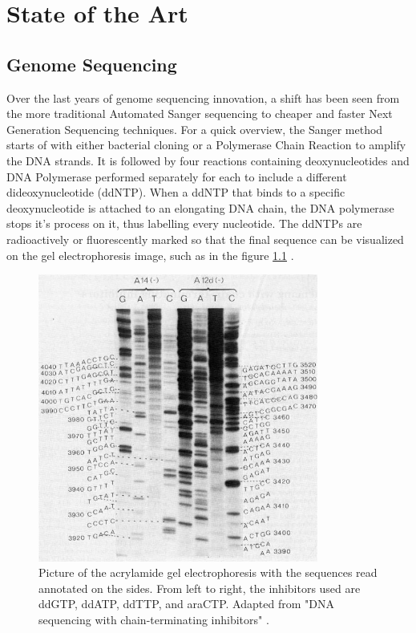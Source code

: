 
\chapter{State of the Art} \label{chapter:sota}



\section{Genome Sequencing}

Over the last years of genome sequencing innovation, a shift has been seen from the more traditional Automated Sanger sequencing to cheaper and faster Next Generation Sequencing techniques. For a quick overview, the Sanger method starts of with either bacterial cloning or a Polymerase Chain Reaction to amplify the \gls{DNA} strands. It is followed by four reactions containing deoxynucleotides and \gls{DNA} Polymerase performed separately for each to include a different dideoxynucleotide (ddNTP). When a ddNTP that binds to a specific deoxynucleotide is attached to an elongating \gls{DNA} chain, the \gls{DNA} polymerase stops it's process on it, thus labelling every nucleotide. The ddNTPs are radioactively or fluorescently marked so that the final sequence can be visualized on the gel electrophoresis image, such as in the figure \ref{sanger} \cite{sanger1977dna}.

\begin{figure}
	\centering
	\includegraphics[width=3.628in]{../images/data_prep/sanger1977dna.jpg}
	\caption{Picture of the acrylamide gel electrophoresis with the sequences read annotated on the sides. From left to right, the inhibitors used are ddGTP, ddATP, ddTTP, and araCTP. Adapted from "DNA sequencing with chain-terminating inhibitors" \cite{sanger1977dna}.} 
	\label{sanger}
\end{figure}

